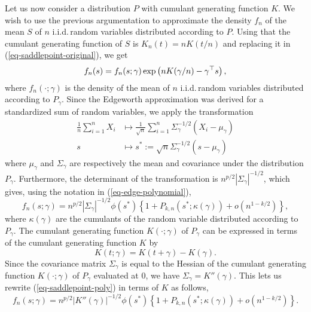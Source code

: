 Let us now consider a distribution $P$ with cumulant generating function $K$. We wish to use the previous argumentation to approximate the density $f_n$ of the mean $S$ of $n$ i.i.d.\,random variables distributed according to $P$. Using that the cumulant generating function of $S$ is $K_n(t) = nK(t/n)$ and replacing it in (\ref{eq-saddlepoint-original}), we get
\begin{equation} \label{eq-fn-in-terms-of-fngamma}
    f_n(s) = f_n(s; \gamma)\exp\left(nK(\gamma / n) - \gamma^\top s\right),
\end{equation}
where $f_n(\cdot; \gamma)$ is the density of the mean of $n$ i.i.d.\,random variables distributed according to $P_\gamma$. Since the Edgeworth approximation was derived for a standardized sum of random variables, we apply the transformation
\begin{align*}
    \frac{1}{n}\sum_{i=1}^n X_i &\mapsto \frac{1}{\sqrt{n}}\sum_{i=1}^n \Sigma_\gamma^{-1/2}(X_i - \mu_\gamma)\\
    s &\mapsto s^* := \sqrt{n}\Sigma_\gamma^{-1/2}(s - \mu_\gamma)
\end{align*}
where $\mu_\gamma$ and $\Sigma_\gamma$ are respectively the mean and covariance under the distribution $P_\gamma$. Furthermore, the determinant of the transformation is $n^{p/2}|\Sigma_\gamma|^{-1/2}$, which gives, using the notation in (\ref{eq-edge-polynomial}),
\begin{equation} \label{eq-saddlepoint-poly}
    f_n(s; \gamma) = n^{p/2}|\Sigma_\gamma|^{-1/2} \phi(s^*)\left\{ 1 + P_{k, n}(s^*; \kappa(\gamma)) + o(n^{1-k/2})\right\},
\end{equation}
where $\kappa(\gamma)$ are the cumulants of the random variable distributed according to $P_\gamma$. The cumulant generating function $K(\cdot; \gamma)$ of $P_\gamma$ can be expressed in terms of the cumulant generating function $K$ by
\begin{equation*}
    K(t; \gamma) = K(t + \gamma) - K(\gamma).
\end{equation*}
Since the covariance matrix $\Sigma_\gamma$ is equal to the Hessian of the cumulant generating function $K(\cdot; \gamma)$ of $P_\gamma$ evaluated at 0, we have $\Sigma_\gamma = K''(\gamma)$. This lets us rewrite (\ref{eq-saddlepoint-poly}) in terms of $K$ as follows,
\begin{equation*}
    f_n(s; \gamma) = n^{p/2}|K''(\gamma)|^{-1/2} \phi(s^*)\left\{ 1 + P_{k, n}(s^*; \kappa(\gamma)) + o(n^{1-k/2})\right\}.
\end{equation*}

